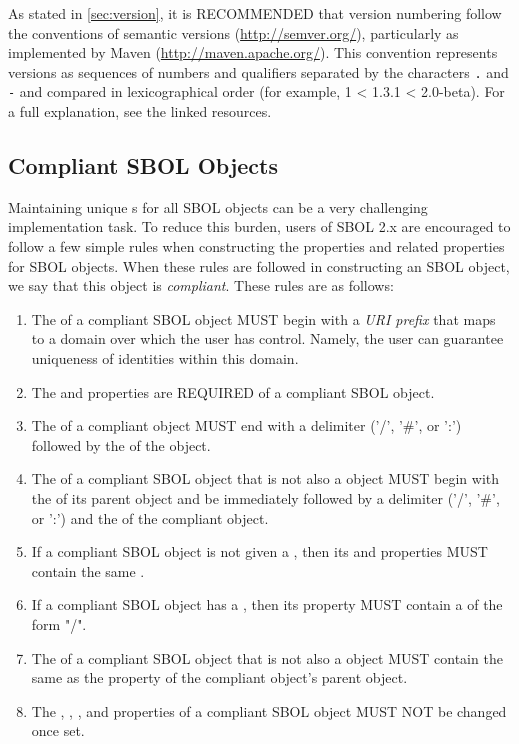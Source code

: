 As stated in \ref{sec:version},  it is RECOMMENDED that version numbering follow the conventions of semantic versions (\url{http://semver.org/}), particularly as implemented by Maven (\url{http://maven.apache.org/}).  
This convention represents versions as sequences of numbers and qualifiers separated by the characters {\tt .} and {\tt -} and compared in lexicographical order (for example, 1 < 1.3.1 < 2.0-beta).  For a full explanation, see the linked resources.

\subsection{Compliant SBOL Objects}
\label{sec:compliant}

Maintaining unique  s for all SBOL objects can be a very challenging implementation task.  To reduce this burden, users of SBOL 2.x are encouraged to follow a few simple rules when constructing the  properties and related properties for SBOL objects.  When these rules are followed in constructing an SBOL object, we say that this object is \emph{compliant}. These rules are as follows:
\begin{enumerate}
\item The  of a compliant SBOL object MUST begin with a \emph{URI prefix} that maps to a domain over which the user has control. Namely, the user can guarantee uniqueness of identities within this domain.
\item The  and  properties are REQUIRED of a compliant SBOL object.
\item The  of a compliant  object MUST end with a delimiter ('/', '\#', or ':') followed by the  of the object. 
\item The  of a compliant SBOL object that is not also a  object MUST begin with the  of its parent object and be immediately followed by a delimiter ('/', '\#', or ':') and the  of the compliant object.
\item If a compliant SBOL object is not given a , then its  and  properties MUST contain the same .
\item If a compliant SBOL object has a , then its  property MUST contain a  of the form  "/".
\item The  of a compliant SBOL object that is not also a  object MUST contain the same  as the  property of the compliant object's parent object.
\item The , , , and  properties of a compliant SBOL object MUST NOT be changed once set.
\end{enumerate}

